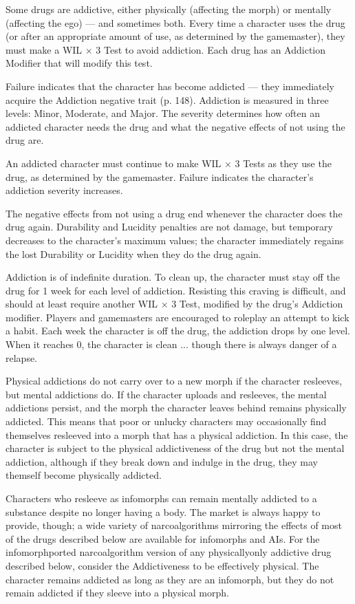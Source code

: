 {{Some drugs are addictive, either physically (affecting the morph) or mentally (affecting the ego) --- and sometimes both. Every time a character uses the drug (or after an appropriate amount of use, as determined by the gamemaster), they must make a WIL $\times$ 3 Test to avoid addiction. Each drug has an Addiction Modifier that will modify this test. 

Failure indicates that the character has become addicted --- they immediately acquire the Addiction negative trait (p. 148). Addiction is measured in three levels: Minor, Moderate, and Major. The severity determines how often an addicted character needs the drug and what the negative effects of not using the drug are. 

An addicted character must continue to make WIL $\times$ 3 Tests as they use the drug, as determined by the gamemaster. Failure indicates the character’s addiction severity increases. 

The negative effects from not using a drug end whenever the character does the drug again. Durability and Lucidity penalties are not damage, but temporary decreases to the character’s maximum values; the character immediately regains the lost Durability or Lucidity when they do the drug again. 

Addiction is of indefinite duration. To clean up, the character must stay off the drug for 1 week for each level of addiction. Resisting this craving is difficult, and should at least require another WIL $\times$ 3 Test, modified by the drug’s Addiction modifier. Players and gamemasters are encouraged to roleplay an attempt to kick a habit. Each week the character is off the drug, the addiction drops by one level. When it reaches 0, the character is clean ... though there is always danger of a relapse. 

Physical addictions do not carry over to a new morph if the character resleeves, but mental addictions do. If the character uploads and resleeves, the mental addictions persist, and the morph the character leaves behind remains physically addicted. This means that poor or unlucky characters may occasionally find themselves resleeved into a morph that has a physical addiction. In this case, the character is subject to the physical addictiveness of the drug but not the mental addiction, although if they break down and indulge in the drug, they may themself become physically addicted. 

Characters who resleeve as infomorphs can remain mentally addicted to a substance despite no longer having a body. The market is always happy to provide, though; a wide variety of narcoalgorithms mirroring the effects of most of the drugs described below are available for infomorphs and AIs. For the infomorphported narcoalgorithm version of any physicallyonly addictive drug described below, consider the Addictiveness to be effectively physical. The character remains addicted as long as they are an infomorph, but they do not remain addicted if they sleeve into a physical morph. 

}}
